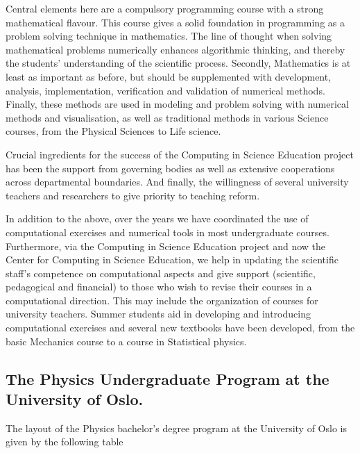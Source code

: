 \documentclass[graybox,envcountchap,sectrefs]{svmult}
\begin{document}
Central elements here are a compulsory programming course with a
strong mathematical flavour. This course gives a solid foundation in
programming as a problem solving technique in mathematics. The line of
thought when solving mathematical problems numerically enhances
algorithmic thinking, and thereby the students' understanding of the
scientific process.  Secondly, Mathematics is at least as important as
before, but should be supplemented with development, analysis,
implementation, verification and validation of numerical
methods. Finally, these methods are used in modeling and problem
solving with numerical methods and visualisation, as well as
traditional methods in various Science courses, from the Physical
Sciences to Life science.

Crucial ingredients for the success of the Computing in Science
Education project has been the support from governing bodies as well
as extensive cooperations across departmental boundaries. And finally, 
the willingness of several university teachers and researchers to give
priority to teaching reform.

In addition to the above, over the years we have coordinated the use
of computational exercises and numerical tools in most undergraduate
courses. Furthermore, via the Computing in Science Education project
and now the Center for Computing in Science Education, we help in
updating the scientific staff's competence on computational aspects
and give support (scientific, pedagogical and financial) to those who
wish to revise their courses in a computational direction. This may
include the organization of courses for university teachers. Summer
students aid in developing and introducing computational exercises and
several new textbooks have been developed, from the basic Mechanics
course to a course in Statistical physics.


\subsection{The Physics Undergraduate Program at the University of Oslo.}
The layout of the Physics bachelor's degree program at the University of Oslo is given by the following table
\end{document}
